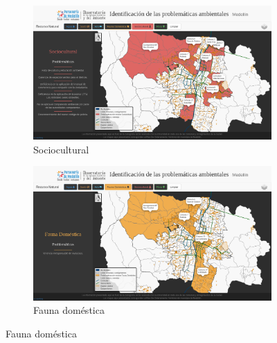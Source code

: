 \documentclass[11pt,letterpaper]{article}
\begin{document}
\begin{figure}[ht!]
\begin{subfigure}{.49\textwidth}
	\includegraphics[width=\textwidth]{../assets/images/recurso_natural/recurso_sociocultural.png}
	\caption{Sociocultural}\label{fig:rSociocultural}
\end{subfigure}	
\hfill
\begin{subfigure}{.49\textwidth}
	\includegraphics[width=\textwidth]{../assets/images/recurso_natural/recurso_fauna_domestica.png}
	\caption{Fauna doméstica}\label{fig:rFauna}
\end{subfigure}				


\end{figure}
\end{document}
